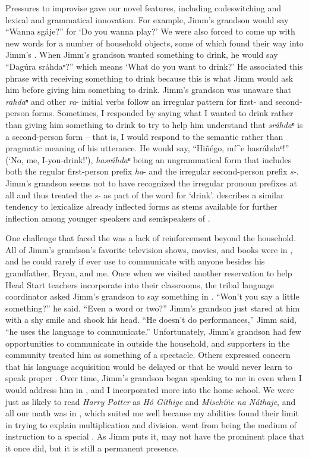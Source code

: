 \documentclass[output=paper]{LSP/langsci}
\begin{document}
Pressures to improvise gave our  novel features, including codeswitching and lexical and grammatical innovation. For example, Jimm's grandson would say ``Wanna sgáje?'' for `Do you wanna play?' We were also forced to come up with new words for a number of household objects, some of which found their way into Jimm's . When Jimm's grandson wanted something to drink, he would say ``Dagúra sráhdaⁿ?'' which means `What do you want to drink?' He associated this phrase with receiving something to drink because this is what Jimm would ask him before giving him something to drink. Jimm's grandson was unaware that \emph{rahdaⁿ} and other \emph{ra}- initial verbs follow an irregular  pattern for first- and second-person forms. Sometimes, I responded by saying what I wanted to drink rather than giving him something to drink to try to help him understand that \emph{sráhdaⁿ} is a second-person form -- that is, I would respond to the semantic rather than pragmatic meaning of his utterance. He would say, ``Hiñégo, mí\^{ }e hasráhdaⁿ!'' (`No, me, I-you-drink!'), \emph{hasráhdaⁿ} being an ungrammatical form that includes both the regular first-person prefix \emph{ha}- and the irregular second-person prefix \emph{s-}. Jimm's grandson seems not to have recognized the irregular pronoun prefixes at all and thus treated the \emph{s-} as part of the word for `drink'.  describes a similar tendency to lexicalize already inflected forms as stems available for further inflection among younger speakers and semispeakers of . 

One challenge that faced the  was a lack of reinforcement beyond the household. All of Jimm's grandson's favorite television shows, movies, and books were in , and he could rarely if ever use  to communicate with anyone besides his grandfather, Bryan, and me. Once when we visited another reservation to help Head Start teachers incorporate  into their classrooms, the tribal language coordinator asked Jimm's grandson to say something in . ``Won't you say a little something?'' he said. ``Even a word or two?'' Jimm's grandson just stared at him with a shy smile and shook his head. ``He doesn't do performances,'' Jimm said, ``he uses the language to communicate.'' Unfortunately, Jimm's grandson had few opportunities to communicate in  outside the household, and supporters in the community treated him as something of a spectacle. Others expressed concern that his language acquisition would be delayed or that he would never learn to speak proper . Over time, Jimm's grandson began speaking to me in  even when I would address him in , and I incorporated more  into the home school. We were just as likely to read \emph{Harry Potter} as \emph{Hó Gíthige} and \emph{Mischíñe na Náthaje}, and all our math was in , which suited me well because my  abilities found their limit in trying to explain multiplication and division.  went from being the medium of instruction to a special . As Jimm puts it,  may not have the prominent place that it once did, but it is still a permanent presence.
\end{document}
